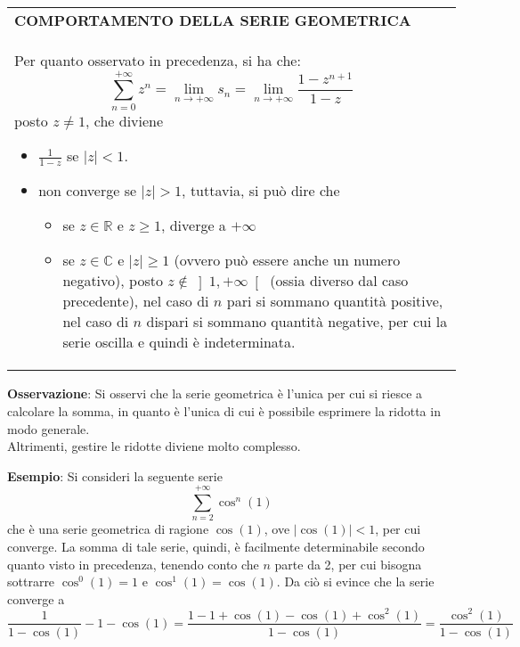 \documentclass[a4paper]{extarticle}
\renewcommand\arraystretch{}
\begin{document}
\vspace{1em}
\setlength{\tabcolsep}{14pt}
\renewcommand{\arraystretch}{2}
\noindent
\begin{tabularx}{\textwidth}{@{}|P|@{}}
    \hline
    {\textbf{COMPORTAMENTO DELLA SERIE GEOMETRICA}}\\
    \parbox{\linewidth}{Per quanto osservato in precedenza, si ha che:
    \[\sum_{n=0}^{+\infty} z^n = \lim_{n \to +\infty} s_n = \lim_{n \to + \infty} \frac{1-z^{n+1}}{1-z}\]
    posto $z \neq 1$, che diviene
    \begin{itemize}
        \item $\displaystyle{\frac{1}{1-z}}$ se $\vert z \vert < 1$.
        \item non converge se $\vert z \vert > 1$, tuttavia, si può dire che
        \begin{itemize}
            \item se $z \in \mathbb{R}$ e $z \geq 1$, diverge a $+\infty$
            \item se $z \in \mathbb{C}$ e $\vert z \vert \geq 1$ (ovvero può essere anche un numero negativo), posto $z \notin \left]1,+\infty \right[$ (ossia diverso dal caso precedente), nel caso di $n$ pari si sommano quantità positive, nel caso di $n$ dispari si sommano quantità negative, per cui la serie oscilla e quindi è indeterminata.
        \end{itemize}
    \end{itemize}
    \vspace{1mm}}\\
    \hline
\end{tabularx}

\vspace{2em}
\noindent
\textbf{Osservazione}: Si osservi che la serie geometrica è l'unica per cui si riesce a calcolare la somma, in quanto è l'unica di cui è possibile esprimere la ridotta in modo generale.\\
Altrimenti, gestire le ridotte diviene molto complesso.

\vspace{1em}
\noindent
\textbf{Esempio}: Si consideri la seguente serie
\[\sum_{n=2}^{+\infty} \cos^{n}(1)\]
che è una serie geometrica di ragione $\cos(1)$, ove $\left \vert \cos(1) \right \vert < 1$, per cui converge. La somma di tale serie, quindi, è facilmente determinabile secondo quanto visto in precedenza, tenendo conto che $n$ parte da 2, per cui bisogna sottrarre $\cos^0(1)=1$ e $\cos^1(1)=\cos(1)$. Da ciò si evince che la serie converge a 
\[\frac{1}{1 - \cos(1)} - 1 - \cos(1) = \frac{1 - 1 + \cos(1) - \cos(1) + \cos^2(1)}{1 - \cos(1)} = \frac{\cos^2(1)}{1 - \cos(1)}\]
\end{document}
